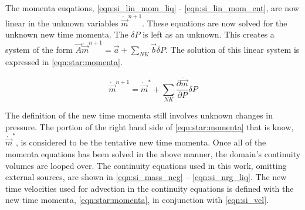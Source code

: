 The momenta euqations, \eqref{eqn:si_lin_mom_liq} - \eqref{eqn:si_lin_mom_ent}, are now linear in the unknown variables $\dot{\vec{m}}^{n+1}$.
These equations are now solved for the unknown new time momenta.
The $\delta P$ is left as an unknown.
This creates a system of the form $\vec{A} \dot{\vec{m}}^{n+1} = \vec{a} + \sum_{NK} \vec{b} \delta P$.
The solution of this linear system is expressed in \eqref{eqn:star:momenta}.

\begin{equation}
\label{eqn:star:momenta}
\dot{\vec{m}}^{n+1} = \dot{\vec{m}}^{*} + \sum_{NK} \frac{\partial \dot{\vec{m}}}{\partial P} \delta P
\end{equation}

The definition of the new time momenta still involves unknown changes in pressure.
The portion of the right hand side of \eqref{eqn:star:momenta} that is know, $\dot{\vec{m}}^{*}$, is considered to be the tentative new time momenta.
Once all of the momenta equations has been solved in the above manner, the domain's continuity volumes are looped over.
The continuity equations used in this work, omitting external sources, are shown in \eqref{eqn:si_mass_ncg} -- \eqref{eqn:si_nrg_liq}. 
The new time velocities used for advection in the continuity equations is defined with the new time momenta, \eqref{eqn:star:momenta}, in conjunction with \eqref{eqn:si_vel}.


